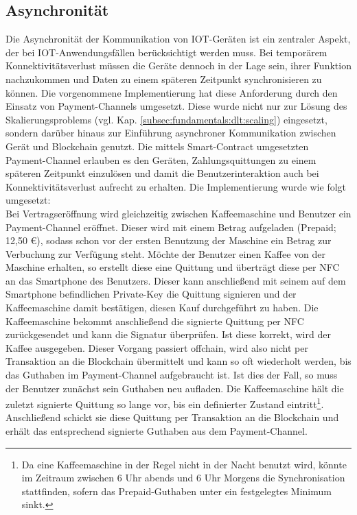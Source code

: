 \subsection{Asynchronität}
\label{subsec:implementation:requirements:async}
Die Asynchronität der Kommunikation von \ac{IOT}-Geräten ist ein zentraler Aspekt, der bei \ac{IOT}-Anwendungsfällen berücksichtigt werden muss. Bei temporärem Konnektivitätsverlust müssen die Geräte dennoch in der Lage sein, ihrer Funktion nachzukommen und Daten zu einem späteren Zeitpunkt synchronisieren zu können. Die vorgenommene Implementierung hat diese Anforderung durch den Einsatz von Payment-Channels umgesetzt. Diese wurde nicht nur zur Lösung des Skalierungsproblems (vgl. Kap. \ref{subsec:fundamentals:dlt:scaling}) eingesetzt, sondern darüber hinaus zur Einführung asynchroner Kommunikation zwischen Gerät und Blockchain genutzt. Die mittels Smart-Contract umgesetzten Payment-Channel erlauben es den Geräten, Zahlungsquittungen zu einem späteren Zeitpunkt einzulösen und damit die Benutzerinteraktion auch bei Konnektivitätsverlust aufrecht zu erhalten. Die Implementierung wurde wie folgt umgesetzt:\\
Bei Vertragseröffnung wird gleichzeitig zwischen Kaffeemaschine und Benutzer ein Payment-Channel eröffnet. Dieser wird mit einem Betrag aufgeladen (Prepaid; 12,50 €), sodass schon vor der ersten Benutzung der Maschine ein Betrag zur Verbuchung zur Verfügung steht. Möchte der Benutzer einen Kaffee von der Maschine erhalten, so erstellt diese eine Quittung und überträgt diese per \ac{NFC} an das Smartphone des Benutzers. Dieser kann anschließend mit seinem auf dem Smartphone befindlichen Private-Key die Quittung signieren und der Kaffeemaschine damit bestätigen, diesen Kauf durchgeführt zu haben. Die Kaffeemaschine bekommt anschließend die signierte Quittung per \ac{NFC} zurückgesendet und kann die Signatur überprüfen. Ist diese korrekt, wird der Kaffee ausgegeben. Dieser Vorgang passiert offchain, wird also nicht per Transaktion an die Blockchain übermittelt und kann so oft wiederholt werden, bis das Guthaben im Payment-Channel aufgebraucht ist. Ist dies der Fall, so muss der Benutzer zunächst sein Guthaben neu aufladen. Die Kaffeemaschine hält die zuletzt signierte Quittung so lange vor, bis ein definierter Zustand eintritt\footnote{Da eine Kaffeemaschine in der Regel nicht in der Nacht benutzt wird, könnte im Zeitraum zwischen 6 Uhr abends und 6 Uhr Morgens die Synchronisation stattfinden, sofern das Prepaid-Guthaben unter ein festgelegtes Minimum sinkt.}. Anschließend schickt sie diese Quittung per Transaktion an die Blockchain und erhält das entsprechend signierte Guthaben aus dem Payment-Channel.


